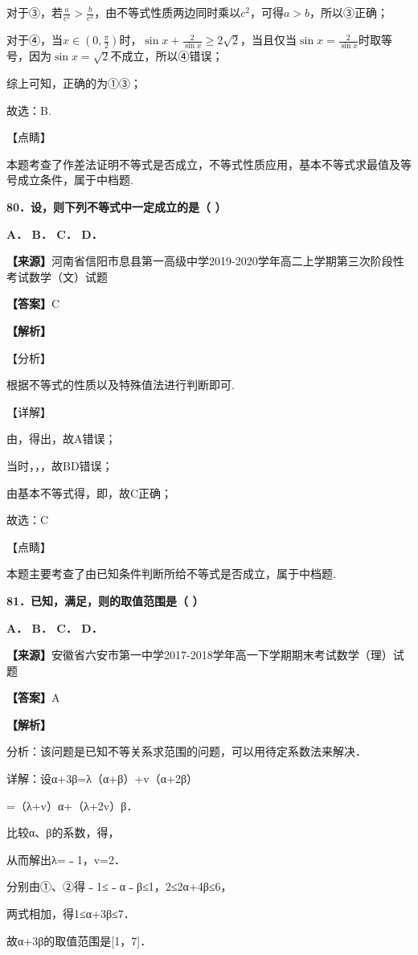 \documentclass[
]{article}
\begin{document}
对于③，若\(\frac{a}{c^{2}} > \frac{b}{c^{2}}\)，由不等式性质两边同时乘以\(c^{2}\)，可得\(a > b\)，所以③正确；

对于④，当\(x \in \left( 0,\frac{\pi}{2} \right)\)时，\(\sin x + \frac{2}{\sin x} \geq 2\sqrt{2}\)，当且仅当\(\sin x = \frac{2}{\sin x}\)时取等号，因为\(\sin x = \sqrt{2}\)不成立，所以④错误；

综上可知，正确的为①③；

故选：B.

【点睛】

本题考查了作差法证明不等式是否成立，不等式性质应用，基本不等式求最值及等号成立条件，属于中档题.

\textbf{80．设，则下列不等式中一定成立的是（ ）}

\textbf{A． B． C． D．}

\textbf{【来源】}河南省信阳市息县第一高级中学2019-2020学年高二上学期第三次阶段性考试数学（文）试题

\textbf{【答案】}C

\textbf{【解析】}

【分析】

根据不等式的性质以及特殊值法进行判断即可.

【详解】

由，得出，故A错误；

当时，，，故BD错误；

由基本不等式得，即，故C正确；

故选：C

【点睛】

本题主要考查了由已知条件判断所给不等式是否成立，属于中档题.

\textbf{81．已知，满足，则的取值范围是（ ）}

\textbf{A． B． C． D．}

\textbf{【来源】}安徽省六安市第一中学2017-2018学年高一下学期期末考试数学（理）试题

\textbf{【答案】}A

\textbf{【解析】}

分析：该问题是已知不等关系求范围的问题，可以用待定系数法来解决．

详解：设α+3β=λ（α+β）+v（α+2β）

=（λ+v）α+（λ+2v）β．

比较α、β的系数，得，

从而解出λ=﹣1，v=2．

分别由①、②得﹣1≤﹣α﹣β≤1，2≤2α+4β≤6，

两式相加，得1≤α+3β≤7．

故α+3β的取值范围是{[}1，7{]}．
\end{document}

